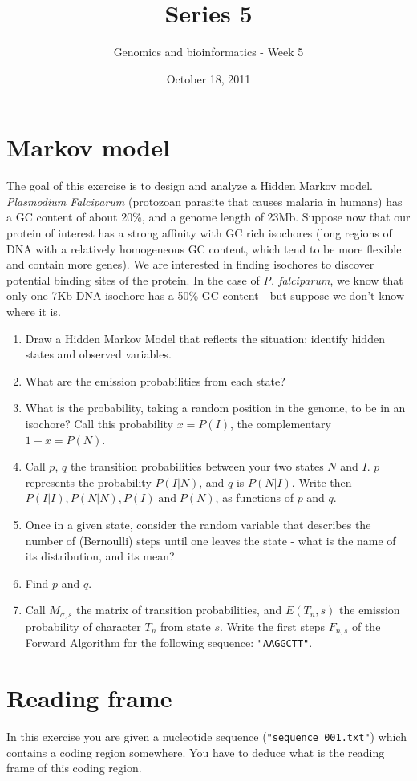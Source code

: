 \documentclass[a4paper,11pt]{article}
\title{Series 5}
\date{October 18, 2011}
\author{Genomics and bioinformatics - Week 5}
\begin{document}
\maketitle

\section{Markov model}
The goal of this exercise is to design and analyze a Hidden Markov model. \\
\emph{Plasmodium Falciparum} (protozoan parasite that causes malaria in humans) has a GC content of about 20\%, and a genome length of 23Mb. Suppose now that our protein of interest has a strong affinity with GC rich isochores (long regions of DNA with a relatively homogeneous GC content, which tend to be more flexible and contain more genes). We are interested in finding isochores to discover potential binding sites of the protein. In the case of \emph{P. falciparum}, we know that only one 7Kb DNA isochore has a 50\% GC content - but suppose we don't know where it is.
\begin{enumerate}
\item Draw a Hidden Markov Model that reflects the situation: identify hidden states and observed variables.
\item What are the emission probabilities from each state?
\item What is the probability, taking a random position in the genome, to be in an isochore? Call this probability $x = P(I)$, the complementary $1-x = P(N)$.
\item Call $p$, $q$ the transition probabilities between your two states $N$ and $I$. $p$ represents the probability $P(I|N)$, and $q$ is $P(N|I)$. Write then $P(I|I), P(N|N), P(I) \;\text{and}\; P(N)$, as functions of $p$ and $q$.
\item Once in a given state, consider the random variable that describes the number of (Bernoulli) steps until one leaves the state - what is the name of its distribution, and its mean?
\item Find $p$ and $q$. 
\item Call $M_{\sigma,s}$ the matrix of transition probabilities, and $E(T_n,s)$ the emission probability of character $T_n$ from state $s$. Write the first steps $F_{n,s}$ of the Forward Algorithm for the following sequence: \texttt{"AAGGCTT"}.
\end{enumerate}

\section{Reading frame}
In this exercise you are given a nucleotide sequence (\texttt{"sequence\_001.txt"}) which contains a coding region somewhere. You have to deduce what is the reading frame of this coding region.
\end{document}
